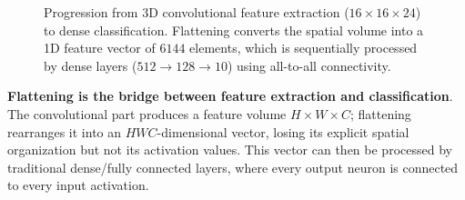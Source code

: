 \begin{figure}[htbp]
    \caption{Progression from 3D convolutional feature extraction ($16 \times 16 \times 24$) to dense classification. Flattening converts the spatial volume into a 1D feature vector of $6144$ elements, which is sequentially processed by dense layers ($512 \to 128 \to 10$) using all-to-all connectivity.}
    \label{fig:cnn-flatten-dense}
\end{figure}

\highspace
\begin{takeawaysbox}
    \textbf{Flattening is the bridge between feature extraction and classification}. The convolutional part produces a feature volume $H \times W \times C$; flattening rearranges it into an $HWC$-dimensional vector, losing its explicit spatial organization but not its activation values. This vector can then be processed by traditional dense/fully connected layers, where every output neuron is connected to every input activation.
\end{takeawaysbox}